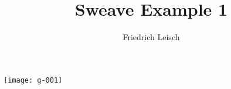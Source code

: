\documentclass[a4paper]{article}
\title{Sweave Example 1}
\author{Friedrich Leisch}
\begin{document}
\maketitle

\texttt{[image: g-001]}
\end{document}

